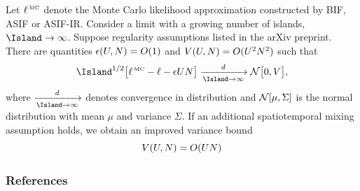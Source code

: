 \documentclass{beamer}
\begin{document}
\begin{frame}
\begin{theorem}  \label{thm:tif}
Let $\ell^{\,\mbox{\tiny MC}}$ denote the Monte Carlo likelihood approximation constructed by BIF, ASIF or ASIF-IR.
Consider a limit with a growing number of islands, $\Island\to\infty$.
Suppose regularity assumptions listed in the arXiv preprint.
There are quantities $\epsilon(U,N) = O(1)$ and $V(U,N)=O(U^2N^2)$ such that
\begin{equation}
\nonumber
\Island^{1/2}\big[ \MC{\loglik}-\loglik-\el\Unit\Time \big]  \xrightarrow[\Island \rightarrow \infty]{d} \normal\big[0,V\big],
\end{equation}
where $\xrightarrow[\Island \rightarrow \infty]{d}$ denotes convergence in distribution and $\mathcal{N}[\mu,\Sigma]$ is the normal distribution with mean $\mu$ and variance $\Sigma$.
If an additional spatiotemporal mixing assumption holds, we obtain an improved variance bound
\begin{equation}
\nonumber
V(U,N) = O(UN)
\end{equation}
\end{theorem}
\end{frame}




\begin{frame}[allowframebreaks]
\frametitle{References}


\end{frame}
\end{document}
